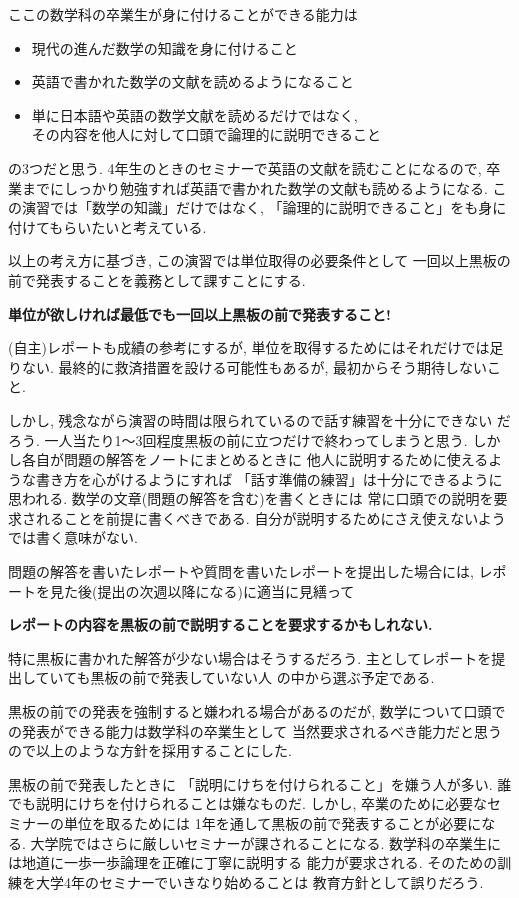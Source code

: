 \documentclass[12pt,twoside]{jarticle}
\begin{document}
ここの数学科の卒業生が身に付けることができる能力は
\begin{itemize}
 \item 現代の進んだ数学の知識を身に付けること
 \item 英語で書かれた数学の文献を読めるようになること
 \item 単に日本語や英語の数学文献を読めるだけではなく, \\
  その内容を他人に対して口頭で論理的に説明できること
\end{itemize}
の3つだと思う.  4年生のときのセミナーで英語の文献を読むことになるので,
卒業までにしっかり勉強すれば英語で書かれた数学の文献も読めるようになる.
この演習では「数学の知識」だけではなく, 
「論理的に説明できること」をも身に付けてもらいたいと考えている.

以上の考え方に基づき, 
この演習では単位取得の必要条件として
一回以上黒板の前で発表することを義務として課すことにする. 
\begin{center}
 \large\bf 単位が欲しければ最低でも一回以上黒板の前で発表すること!
\end{center}
(自主)レポートも成績の参考にするが, 
単位を取得するためにはそれだけでは足りない. 
最終的に救済措置を設ける可能性もあるが, 
最初からそう期待しないこと.

しかし, 残念ながら演習の時間は限られているので話す練習を十分にできない
だろう. 一人当たり1〜3回程度黒板の前に立つだけで終わってしまうと思う.
しかし各自が問題の解答をノートにまとめるときに
他人に説明するために使えるような書き方を心がけるようにすれば
「話す準備の練習」は十分にできるように思われる.
数学の文章(問題の解答を含む)を書くときには
常に口頭での説明を要求されることを前提に書くべきである.
自分が説明するためにさえ使えないようでは書く意味がない.

問題の解答を書いたレポートや質問を書いたレポートを提出した場合には, 
レポートを見た後(提出の次週以降になる)に適当に見繕って
\begin{center}
 \large\bf
 レポートの内容を黒板の前で説明することを要求するかもしれない.
\end{center}
特に黒板に書かれた解答が少ない場合はそうするだろう.
主としてレポートを提出していても黒板の前で発表していない人
の中から選ぶ予定である.

黒板の前での発表を強制すると嫌われる場合があるのだが, 
数学について口頭での発表ができる能力は数学科の卒業生として
当然要求されるべき能力だと思うので以上のような方針を採用することにした.

黒板の前で発表したときに
「説明にけちを付けられること」を嫌う人が多い.
誰でも説明にけちを付けられることは嫌なものだ.
しかし, 卒業のために必要なセミナーの単位を取るためには
1年を通して黒板の前で発表することが必要になる.
大学院ではさらに厳しいセミナーが課されることになる.
数学科の卒業生には地道に一歩一歩論理を正確に丁寧に説明する
能力が要求される.
そのための訓練を大学4年のセミナーでいきなり始めることは
教育方針として誤りだろう.
\end{document}
